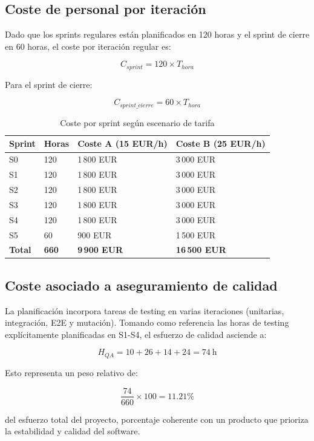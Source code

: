 \subsection{Coste de personal por iteraci\'on}

Dado que los sprints regulares est\'an planificados en 120 horas y el sprint de cierre en 60 horas,
el coste por iteraci\'on regular es:

\[
C_{sprint} = 120 \times T_{hora}
\]


Para el sprint de cierre:

\[
C_{sprint\_cierre} = 60 \times T_{hora}
\]
\begin{table}[!htbp]
\centering
\begin{tabular}{|P{2cm}|P{2.2cm}|P{3.3cm}|P{3.3cm}|}
\hline
\textbf{Sprint} & \textbf{Horas} & \textbf{Coste A (15 EUR/h)} & \textbf{Coste B (25 EUR/h)} \\
\hline
S0 & 120 & 1\,800 EUR & 3\,000 EUR \\
\hline
S1 & 120 & 1\,800 EUR & 3\,000 EUR \\
\hline
S2 & 120 & 1\,800 EUR & 3\,000 EUR \\
\hline
S3 & 120 & 1\,800 EUR & 3\,000 EUR \\
\hline
S4 & 120 & 1\,800 EUR & 3\,000 EUR \\
\hline
S5 & 60 & 900 EUR & 1\,500 EUR \\
\hline
\textbf{Total} & \textbf{660} & \textbf{9\,900 EUR} & \textbf{16\,500 EUR} \\
\hline
\end{tabular}
\caption{Coste por sprint seg\'un escenario de tarifa}
\label{tab:coste-por-sprint}
\end{table}

\subsection{Coste asociado a aseguramiento de calidad}

La planificaci\'on incorpora tareas de testing en varias iteraciones
(unitarias, integraci\'on, E2E y mutaci\'on).
Tomando como referencia las horas de testing expl\'icitamente planificadas
en S1-S4, el esfuerzo de calidad asciende a:

\[
H_{QA} = 10 + 26 + 14 + 24 = 74\ \text{h}
\]

Esto representa un peso relativo de:

\[
\frac{74}{660} \times 100 = 11.21\%
\]

del esfuerzo total del proyecto, porcentaje coherente con un producto
que prioriza la estabilidad y calidad del software.

